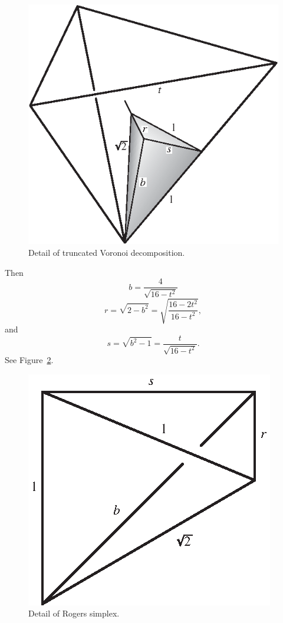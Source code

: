 \begin{figure}
\begin{center}
\includegraphics{PS/quad3}
\end{center}
\caption{Detail of truncated Voronoi decomposition.}
\label{fig:quad3}
\end{figure}

Then
\[
b = \frac{4}{\sqrt{16-t^2}}
\]
\[
r = \sqrt{2-b^2} = \sqrt{\frac{16-2t^2}{16-t^2}},
\]
and
\[
s = \sqrt{b^2-1} = \frac{t}{\sqrt{16-t^2}}.
\]
See Figure~\ref{fig:quad4}.

\begin{figure}
\begin{center}
\includegraphics{PS/quad4}
\end{center}
\caption{Detail of Rogers simplex.}
\label{fig:quad4}
\end{figure}

